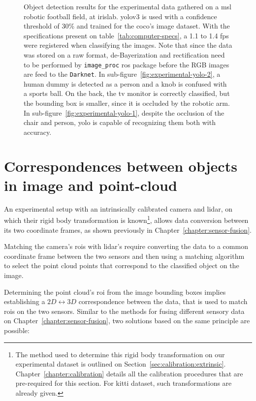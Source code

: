 \begin{figure}[!ht]
\begin{subfigure}[t]{0.45\textwidth}
	\end{subfigure}
	\caption{Object detection results for the experimental data gathered on a \ac{msl} robotic football field, at \ac{irislab}. \ac{yolo}v3 is used with a confidence threshold of 30\% and trained for the \ac{coco}'s image dataset. With the specifications present on table~\ref{tab:computer-specs}, a 1.1 to 1.4 \ac{fps} were registered when classifying the images. Note that since the data was stored on a raw format, de-Bayerization and rectification need to be performed by \texttt{image\_proc} \ac{ros} package before the RGB images are feed to the \texttt{Darknet}. In sub-figure~\ref{fig:experimental-yolo-2}, a human dummy is detected as a person and a knob is confused with a sports ball. On the back, the tv monitor is correctly classified, but the bounding box is smaller, since it is occluded by the robotic arm. In sub-figure~\ref{fig:experimental-yolo-1}, despite the occlusion of the chair and person, \ac{yolo} is capable of recognizing them both with accuracy.}
	\label{fig:experimental-object-detection}
\end{figure}


\section{Correspondences between objects in image and point-cloud}
An experimental setup with an intrinsically calibrated camera and \ac{lidar}, on which their rigid body transformation is known\footnote{The method used to determine this rigid body transformation on our experimental dataset is outlined on Section~\ref{sec:calibration:extrinsic}. Chapter~\ref{chapter:calibration} details all the calibration procedures that are pre-required for this section. For \ac{kitti} dataset, such transformations are already given.}, allows data conversion between its two coordinate frames, as shown previously in Chapter~\ref{chapter:sensor-fusion}. 

Matching the camera's \acp{roi} with \ac{lidar}'s require converting the data to a common coordinate frame between the two sensors and then using a matching algorithm to select the point cloud points that correspond to the classified object on the image.

Determining the point cloud's \ac{roi} from the image bounding boxes implies establishing a $2D \leftrightarrow 3D$ correspondence between the data, that is used to match \acp{roi} on the two sensors. Similar to the methods for fusing different sensory data on Chapter~\ref{chapter:sensor-fusion}, two solutions based on the same principle are possible:

